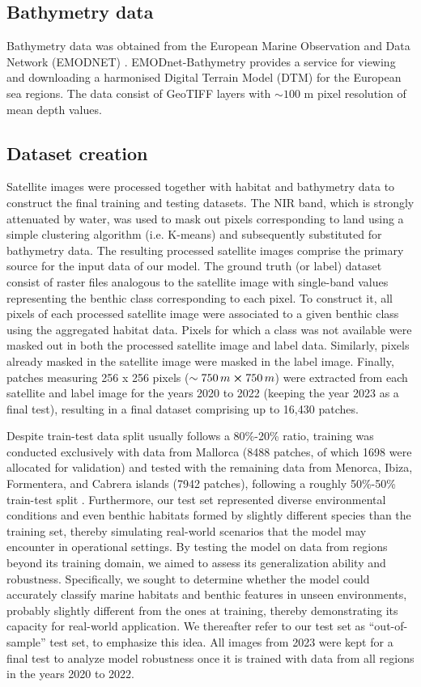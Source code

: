 \subsection{Bathymetry data}

Bathymetry data was obtained from the European Marine Observation and Data
Network (EMODNET) \cite{emodnet}. EMODnet-Bathymetry provides a service for
viewing and downloading a harmonised Digital Terrain Model (DTM) for the
European sea regions. The data consist of GeoTIFF layers with $\sim100$ m pixel
resolution of mean depth values.

\subsection{Dataset creation}

Satellite images were processed together with habitat and bathymetry data to
construct the final training and testing datasets. The NIR band, which is
strongly attenuated by water, was used to mask out pixels corresponding to land
using a simple clustering algorithm (i.e. K-means) and subsequently substituted
for bathymetry data. The resulting processed
satellite images comprise the primary source for the input data of our model.
The ground truth (or label) dataset consist of raster files analogous to the
satellite image with single-band values representing the benthic class
corresponding to each pixel. To construct it, all pixels of each processed
satellite image were associated to a given benthic class using the aggregated
habitat data. Pixels for which a class was not available were masked out in
both the processed satellite image and label data. Similarly, pixels already
masked in the satellite image were masked in the label image. Finally, patches
measuring 256 x 256 pixels ($\sim 750\,m \cross 750\,m$) were extracted from
each satellite and label image for the years 2020 to 2022 (keeping the year
2023 as a final test), resulting in a final dataset comprising up to
16,430 patches.

Despite train-test data split usually follows a 80\%-20\% ratio, training was
conducted exclusively with data from Mallorca (8488
patches, of which 1698 were allocated for validation) and tested with the
remaining data from Menorca, Ibiza, Formentera, and Cabrera islands (7942
patches), following a roughly 50\%-50\% train-test split . Furthermore, our
test set represented diverse environmental conditions and even benthic habitats
formed by slightly different species than the training set, thereby simulating
real-world scenarios that the model may encounter in operational settings. By
testing the model on data from regions beyond its training domain, we aimed to
assess its generalization ability and robustness. Specifically, we sought to
determine whether the model could accurately classify marine habitats and
benthic features in unseen environments, probably slightly different from the
ones at training, thereby demonstrating its capacity for real-world
application. We thereafter refer to our test set as ``out-of-sample'' test set,
to emphasize this idea. All images from 2023 were kept for a final test to
analyze model robustness once it is trained with data from all regions in the
years 2020 to 2022.

